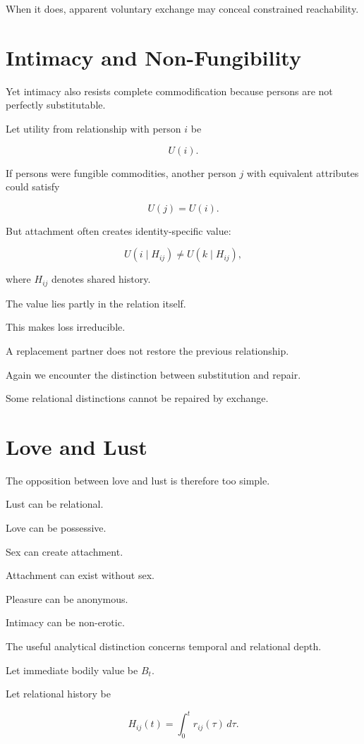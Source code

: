 \documentclass[11pt,oneside]{book}
\theoremstyle{definition}
\theoremstyle{remark}
\begin{document}
When it does, apparent voluntary exchange may conceal constrained reachability.

\section{Intimacy and Non-Fungibility}

Yet intimacy also resists complete commodification because persons are not perfectly substitutable.

Let utility from relationship with person \(i\) be

\[
U(i).
\]

If persons were fungible commodities, another person \(j\) with equivalent attributes could satisfy

\[
U(j)=U(i).
\]

But attachment often creates identity-specific value:

\[
U(i\mid H_{ij})
\neq
U(k\mid H_{ij}),
\]

where \(H_{ij}\) denotes shared history.

The value lies partly in the relation itself.

This makes loss irreducible.

A replacement partner does not restore the previous relationship.

Again we encounter the distinction between substitution and repair.

Some relational distinctions cannot be repaired by exchange.

\section{Love and Lust}

The opposition between love and lust is therefore too simple.

Lust can be relational.

Love can be possessive.

Sex can create attachment.

Attachment can exist without sex.

Pleasure can be anonymous.

Intimacy can be non-erotic.

The useful analytical distinction concerns temporal and relational depth.

Let immediate bodily value be \(B_t\).

Let relational history be

\[
H_{ij}(t)
=
\int_0^t
r_{ij}(\tau)\,d\tau.
\]
\end{document}
